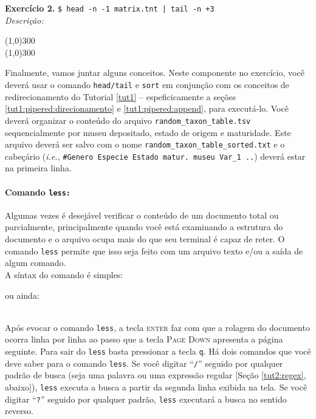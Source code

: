 \begin{refsection}
\begin{blackBlock}{\textbf{Exercício 2.}}
\texttt{\$ head -n -1 matrix.tnt | tail -n +3}
\\
\textit{Descrição:}
\begin{center}
\line(1,0){300}\\
\line(1,0){300}\\
\end{center}

Finalmente, vamos juntar alguns conceitos. Neste componente no exercício, você deverá usar o comando \texttt{head/tail} e \texttt{sort} em conjunção com os conceitos de redirecionamento do Tutorial \ref{tut1} -- espeficicamente a seções \ref{tut1:pipered:direcionamento} e \ref{tut1:pipered:append}, para executá-lo. Você deverá organizar o conteúdo do arquivo \texttt{random\_taxon\_table.tsv} sequencialmente por museu depositado, estado de origem e maturidade. Este arquivo deverá ser salvo com o nome \texttt{random\_taxon\_table\_sorted.txt} e o cabeçário (\textit{i.e.}, \texttt{\#Genero Especie Estado matur. museu Var\_1 ..}) deverá estar na primeira linha.

\end{blackBlock}

\paragraph{Comando \texttt{less:}}\label{tut2:text:editors:texttools:less}
	Algumas vezes é desejável verificar o conteúdo de um documento total ou parcialmente, principalmente quando você está examinando a estrutura do documento e o arquivo ocupa mais do que seu terminal é capaz de reter. O comando \texttt{less} permite que isso seja feito com um arquivo texto e/ou a saída de algum comando.\\
A síntax do comando é simples:\\

ou ainda:

\\

Após evocar o comando \texttt{less}, a tecla \textsc{enter} faz com que a rolagem do documento ocorra linha por linha ao passo que a tecla \textsc{Page Down} apresenta a página seguinte. Para sair do \texttt{less} basta pressionar a tecla \texttt{q}. Há dois comandos que você deve saber para o comando \texttt{less}. Se você digitar ``\texttt{/}'' seguido por qualquer padrão de busca (seja uma palavra ou uma expressão regular [Seção \ref{tut2:regex}, abaixo]), \texttt{less} executa a busca a partir da segunda linha exibida na tela. Se você digitar ``\texttt{?}'' seguido por qualquer padrão,  \texttt{less} executará a busca no sentido reverso.\\


\end{refsection}
